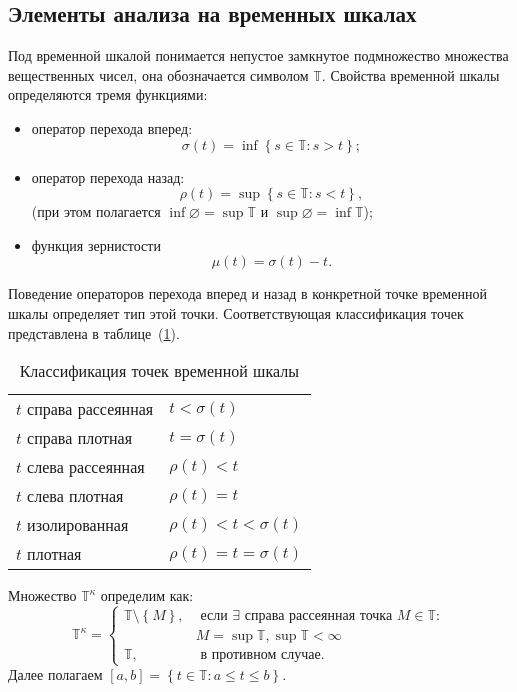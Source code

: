 \subsection{Элементы анализа на временных шкалах}
\begin{definition}
	Под временной шкалой понимается непустое замкнутое подмножество множества
	вещественных чисел, она обозначается символом $\mathbb{T}$.
	Свойства временной шкалы определяются тремя функциями:
	\begin{itemize}
		\item[1)] оператор перехода вперед:
		\[
		\sigma(t) = \inf\left\{s \in \mathbb{T}: s > t\right\};
		\]
		\item[2)] оператор перехода назад:
		\[
		\rho(t) = \sup\left\{s \in \mathbb{T}: s < t\right\},
		\]
		(при этом полагается $\inf\varnothing = \sup{\mathbb{T}}$ и $\sup\varnothing = \inf{\mathbb{T}}$);
		\item[3)] функция зернистости
		$$\mu(t) = \sigma(t) - t.$$
	\end{itemize}
\end{definition}
Поведение операторов перехода вперед и назад в конкретной точке временной шкалы
определяет тип этой точки. Соответствующая классификация точек представлена в
таблице~(\ref{tab:pointclass}).
\begin{table}[h]
	\begin{center}
		\begin{tabular}{|l|l|}
			\hline
			$t$ справа рассеянная & $t < \sigma(t)$ \\
			$t$ справа плотная    & $t = \sigma(t)$ \\
			$t$ слева рассеянная  & $ \rho(t) < t $ \\
			$t$ слева плотная     & $ \rho(t) = t $ \\
			$t$ изолированная      & $\rho(t) < t < \sigma(t)$ \\
			$t$ плотная           & $\rho(t) = t = \sigma(t)$ \\
			\hline
		\end{tabular}
	\end{center}
	\caption{Классификация точек временной шкалы}		
	
	\label{tab:pointclass}
\end{table}

\begin{definition}
	 Множество $\mathbb{T}^\kappa$ определим как:
	 \[
	 \mathbb{T}^\kappa =
	 \begin{cases}
	 \mathbb{T}\setminus \left\{M\right\}, & \text{ если }
	 \exists \text{ справа рассеянная точка } M \in \mathbb{T}:\\
	 & M = \sup\mathbb{T}, \sup\mathbb{T}<\infty  \\
	 \mathbb{T} , & \text{ в противном случае}.
	 \end{cases}
	 \]
	 Далее полагаем $\left[a, b\right] =
	 \left\{t \in \mathbb{T} : a \leqslant t \leqslant b\right\}$.
\end{definition}

